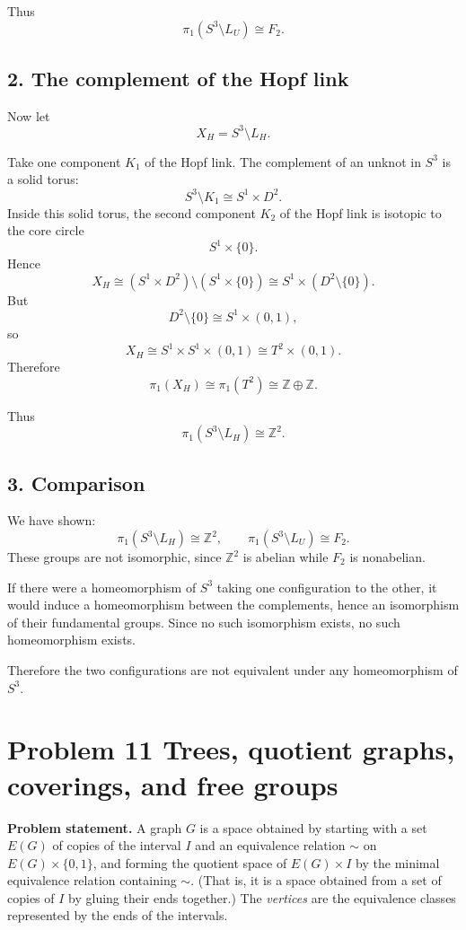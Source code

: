 \documentclass[12pt,a4paper]{article}
\theoremstyle{notespace}
\begin{document}
Thus
\[
\pi_1(S^3\setminus L_U)\cong F_2.
\]

\subsection*{2. The complement of the Hopf link}
Now let
\[
X_H = S^3 \setminus L_H.
\]

Take one component \(K_1\) of the Hopf link. The complement of an unknot in \(S^3\) is a solid torus:
\[
S^3 \setminus K_1 \cong S^1 \times D^2.
\]
Inside this solid torus, the second component \(K_2\) of the Hopf link is isotopic to the core circle
\[
S^1 \times \{0\}.
\]
Hence
\[
X_H \cong (S^1\times D^2)\setminus (S^1\times \{0\})
\cong S^1 \times (D^2\setminus \{0\}).
\]
But
\[
D^2\setminus \{0\}\cong S^1\times (0,1),
\]
so
\[
X_H \cong S^1\times S^1\times (0,1)\cong T^2\times (0,1).
\]
Therefore
\[
\pi_1(X_H)\cong \pi_1(T^2)\cong \mathbb{Z}\oplus \mathbb{Z}.
\]

Thus
\[
\pi_1(S^3\setminus L_H)\cong \mathbb{Z}^2.
\]

\subsection*{3. Comparison}
We have shown:
\[
\pi_1(S^3\setminus L_H)\cong \mathbb{Z}^2,
\qquad
\pi_1(S^3\setminus L_U)\cong F_2.
\]
These groups are not isomorphic, since \(\mathbb{Z}^2\) is abelian while \(F_2\) is nonabelian.

If there were a homeomorphism of \(S^3\) taking one configuration to the other, it would induce a homeomorphism between the complements, hence an isomorphism of their fundamental groups. Since no such isomorphism exists, no such homeomorphism exists.

\medskip

Therefore the two configurations are not equivalent under any homeomorphism of \(S^3\).



\section{Problem 11 Trees, quotient graphs, coverings, and free groups}

\textbf{Problem statement.}
A graph \(G\) is a space obtained by starting with a set \(E(G)\) of copies of the interval \(I\) and an equivalence relation \(\sim\) on \(E(G)\times \{0,1\}\), and forming the quotient space of \(E(G)\times I\) by the minimal equivalence relation containing \(\sim\). (That is, it is a space obtained from a set of copies of \(I\) by gluing their ends together.) The \emph{vertices} are the equivalence classes represented by the ends of the intervals.
\end{document}
